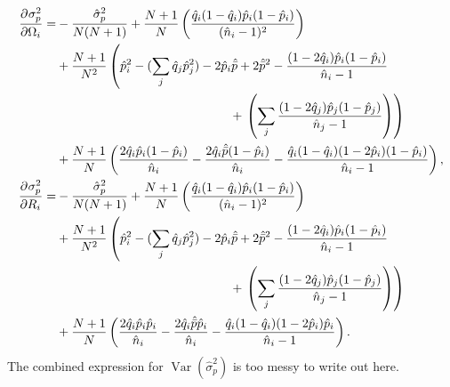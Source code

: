 \documentclass[12pt]{article}
\newcommand{\pdiff}[3][\rule{0mm}{0mm}]{\frac{\partial^{#1} #2}{\partial {#3}^{#1}}}
\DeclareMathOperator{\var}{Var}
\newcommand{\prn}[1]{\left ( #1 \right )}
\begin{document}
\begin{equation}\label{eq:varsigmap}
  \begin{aligned}
    \pdiff{\sigma_p^2}{\Omega_i} =& -\frac{\hat{\sigma}_p^2}{N(N+1)} + \frac{N+1}{N} \prn{\frac{\hat{q}_i (1-\hat{q}_i) \hat{p}_i (1-\hat{p}_i)} {(\hat{n}_i-1)^2}}
    \\ &+
    \frac{N+1}{N^2} \prn{ \hat{p}_i^2 - (\sum_j \hat{q}_j\hat{p}_j^2) - 2 \hat{p}_i\hat{\bar{p}} + 2 \hat{\bar{p}}^2 - \frac{(1-2\hat{q}_i) \hat{p}_i (1-\hat{p}_i)} {\hat{n}_i-1}
    \right.\\&\phantom{\prn{\frac{N+1}{N^2}}\hat{p}_i^2 - (\sum_j \hat{q}_j\hat{p}_j^2)- 2 \hat{p}_i\hat{\bar{p}}}+\left.
    \prn{\sum_j \frac{(1-2\hat{q}_j) \hat{p}_j (1-\hat{p}_j)} {\hat{n}_j-1} }
    }\\&+
    \frac{N+1}{N} \prn{  \frac{2\hat{q}_i \hat{p}_i (1-\hat{p}_i)} {\hat{n}_i} - \frac{2\hat{q}_i \hat{\bar{p}} (1-\hat{p}_i)} {\hat{n}_i} -  \frac{\hat{q}_i(1-\hat{q}_i) (1-2\hat{p}_i) (1-\hat{p}_i)} {\hat{n}_i-1}
    },\\
    \pdiff{\sigma_p^2}{R_i} =&
    -\frac{\hat{\sigma}_p^2}{N(N+1)} + \frac{N+1}{N} \prn{\frac{\hat{q}_i (1-\hat{q}_i) \hat{p}_i (1-\hat{p}_i)} {(\hat{n}_i-1)^2}}
    \\ &+
    \frac{N+1}{N^2} \prn{ \hat{p}_i^2 - (\sum_j \hat{q}_j\hat{p}_j^2) - 2 \hat{p}_i\hat{\bar{p}} + 2 \hat{\bar{p}}^2 - \frac{(1-2\hat{q}_i) \hat{p}_i (1-\hat{p}_i)} {\hat{n}_i-1} 
    \right.\\&\phantom{\prn{\frac{N+1}{N^2}}\hat{p}_i^2 - (\sum_j \hat{q}_j\hat{p}_j^2)- 2 \hat{p}_i\hat{\bar{p}}}+\left.
    \prn{\sum_j \frac{(1-2\hat{q}_j) \hat{p}_j (1-\hat{p}_j)} {\hat{n}_j-1} }
    }\\&+
    \frac{N+1}{N} \prn{  \frac{2\hat{q}_i \hat{p}_i \hat{p}_i} {\hat{n}_i} - \frac{2\hat{q}_i \hat{\bar{p}} \hat{p}_i} {\hat{n}_i} -  \frac{\hat{q}_i(1-\hat{q}_i) (1-2\hat{p}_i) \hat{p}_i} {\hat{n}_i-1}
    }.
  \end{aligned}
\end{equation}
%
The combined expression for $\var(\hat{\sigma}_p^2)$ is too messy to write out here.







\end{document}
